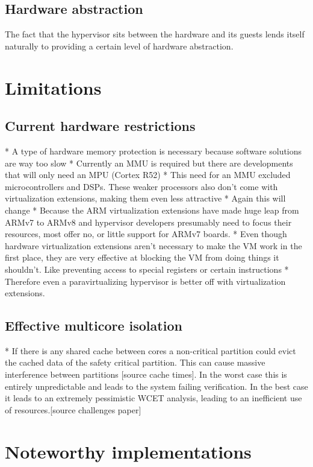 \subsection{Hardware abstraction}
The fact that the hypervisor sits between the hardware and its guests lends itself naturally to providing a certain level of hardware abstraction. 


\section{Limitations}

\subsection{Current hardware restrictions}
* A type of hardware memory protection is necessary because software solutions are way too slow
* Currently an MMU is required but there are developments that will only need an MPU (Cortex R52)
* This need for an MMU excluded microcontrollers and DSPs. These weaker processors also don't come with virtualization extensions, making them even less attractive
* Again this will change
* Because the ARM virtualization extensions have made huge leap from ARMv7 to ARMv8 and hypervisor developers presumably need to focus their resources, most offer no, or little support for ARMv7 boards.
* Even though hardware virtualization extensions aren't necessary to make the VM work in the first place, they are very effective at blocking the VM from doing things it shouldn't. Like preventing access to special registers or certain instructions %
* Therefore even a paravirtualizing hypervisor is better off with virtualization extensions.
\subsection{Effective multicore isolation}
* If there is any shared cache between cores a non-critical partition could evict the cached data of the safety critical partition. This can cause massive interference between partitions [source cache times]. In the worst case this is entirely unpredictable and leads to the system failing verification. In the best case it leads to an extremely pessimistic \gls{WCET} analysis, leading to an inefficient use of resources.[source challenges paper]

\section{Noteworthy implementations}
